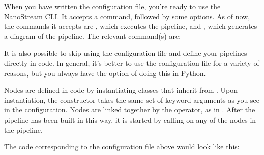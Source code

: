 \documentclass[letterpaper,10pt,english]{sphinxmanual}
\begin{document}
When you have written the configuration file, you’re ready to use the
NanoStream CLI. It accepts a command, followed by some options. As of now, the
commands it accepts are , which executes the pipeline, and ,
which generates a diagram of the pipeline. The relevant command(s) are:

%
\begin{sphinxVerbatim}[commandchars=\\\{\}]
  \PYG{p}{[}  \PYG{p}{]}  
\end{sphinxVerbatim}

It is also possible to skip using the configuration file and define your
pipelines directly in code. In general, it’s better to use the configuration
file for a variety of reasons, but you always have the option of doing this
in Python.

Nodes are defined in code by instantiating classes that inherit from
. Upon instantiation, the constructor takes the same set of
keyword arguments as you see in the configuration. Nodes are linked together
by the \sphinxcode{\sphinxupquote{\textgreater{}}} operator, as in . After the pipeline has been
built in this way, it is started by calling  on any
of the nodes in the pipeline.

The code corresponding to the configuration file above would look like this:

%
\begin{sphinxVerbatim}[commandchars=\\\{\}]
 
    \PYG{p}{[} \PYG{p}{]}
  

  

\end{sphinxVerbatim}
\end{document}
